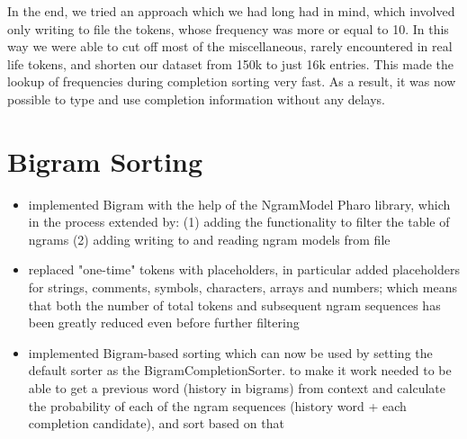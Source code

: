 In the end, we tried an approach which we had long had in mind, which involved only writing to file the tokens, whose frequency was more or equal to 10. In this way we were able to cut off most of the miscellaneous, rarely encountered in real life tokens, and shorten our dataset from 150k to just 16k entries. This made the lookup of frequencies during completion sorting very fast. As a result, it was now possible to type and use completion information without any delays.

\section{Bigram Sorting}
\begin{itemize}
    \item implemented Bigram with the help of the NgramModel Pharo library, which in the process extended by: (1) adding the functionality to filter the table of ngrams (2) adding writing to and reading ngram models from file
    \item replaced "one-time" tokens with placeholders, in particular added placeholders for strings, comments, symbols, characters, arrays and numbers; which means that both the number of total tokens and subsequent ngram sequences has been greatly reduced even before further filtering
    \item implemented Bigram-based sorting which can now be used by setting the default sorter as the BigramCompletionSorter. to make it work needed to be able to get a previous word (history in bigrams) from context and calculate the probability of each of the ngram sequences (history word + each completion candidate), and sort based on that
\end{itemize}